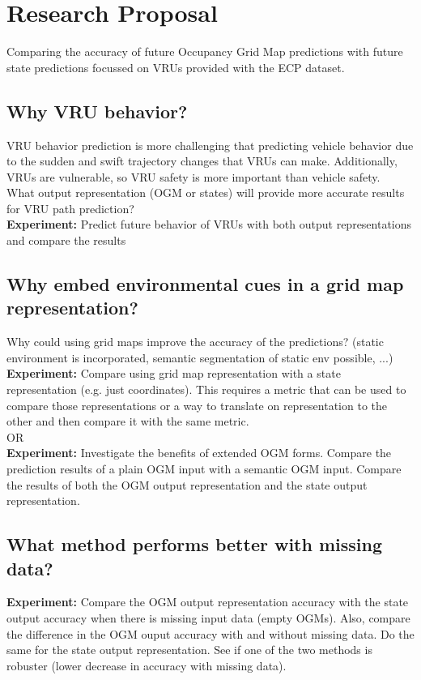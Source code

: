 \section{Research Proposal} \label{sec:res_prop}
Comparing the accuracy of future Occupancy Grid Map predictions with future state predictions focussed on VRUs provided with the ECP dataset.
\\

\subsection{Why VRU behavior?}
VRU behavior prediction is more challenging that predicting vehicle behavior due to the sudden and swift trajectory changes that VRUs can make. Additionally, VRUs are vulnerable, so VRU safety is more important than vehicle safety. \\

What output representation (OGM or states) will provide more accurate results for VRU path prediction? \\

\textbf{Experiment:} Predict future behavior of VRUs with both output representations and compare the results

\subsection{Why embed environmental cues in a grid map representation?}
Why could using grid maps improve the accuracy of the predictions? (static environment is incorporated, semantic segmentation of static env possible, ...) \\

\textbf{Experiment:} Compare using grid map representation with a state representation (e.g. just coordinates). This requires a metric that can be used to compare those representations or a way to translate on representation to the other and then compare it with the same metric. \\

OR \\

\textbf{Experiment:} Investigate the benefits of extended OGM forms. Compare the prediction results of a plain OGM input with a semantic OGM input. Compare the results of both the OGM output representation and the state output representation. \\

\subsection{What method performs better with missing data?}
\textbf{Experiment:} Compare the OGM output representation accuracy with the state output accuracy when there is missing input data (empty OGMs). Also, compare the difference in the OGM ouput accuracy with and without missing data. Do the same for the state output representation. See if one of the two methods is robuster (lower decrease in accuracy with missing data).

